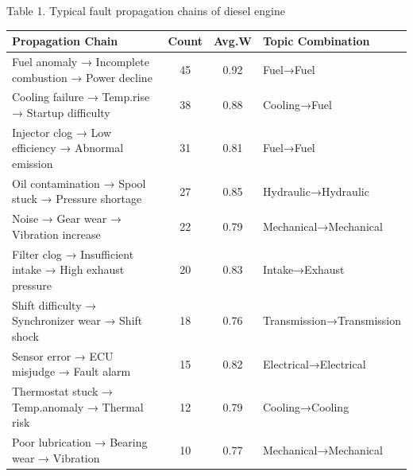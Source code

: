 \documentclass[conference]{IEEEconf}
\begin{document}
\begin{table}[hb]
  \centering
  \centerline {Table 1. Typical fault propagation chains of diesel engine}
  \scriptsize
  \begin{tabular}{|p{2.9cm}|c|c|l|}
    \hline
    \textbf{Propagation Chain} & \textbf{Count} & \textbf{Avg.W} & \textbf{Topic Combination} \\ \hline
    Fuel anomaly → Incomplete combustion → Power decline & 45 & 0.92 & Fuel→Fuel \\ \hline
    Cooling failure → Temp.rise → Startup difficulty & 38 & 0.88 & Cooling→Fuel \\ \hline
    Injector clog → Low efficiency → Abnormal emission & 31 & 0.81 & Fuel→Fuel \\ \hline
    Oil contamination → Spool stuck → Pressure shortage & 27 & 0.85 & Hydraulic→Hydraulic \\ \hline
    Noise → Gear wear → Vibration increase & 22 & 0.79 & Mechanical→Mechanical \\ \hline
    Filter clog → Insufficient intake → High exhaust pressure & 20 & 0.83 & Intake→Exhaust \\ \hline
    Shift difficulty → Synchronizer wear → Shift shock & 18 & 0.76 & Transmission→Transmission \\ \hline
    Sensor error → ECU misjudge → Fault alarm & 15 & 0.82 & Electrical→Electrical \\ \hline
    Thermostat stuck → Temp.anomaly → Thermal risk & 12 & 0.79 & Cooling→Cooling \\ \hline
    Poor lubrication → Bearing wear → Vibration & 10 & 0.77 & Mechanical→Mechanical \\ \hline
  \end{tabular}
  \label{tab:ClassicFaultChain}
\end{table}
\end{document}
